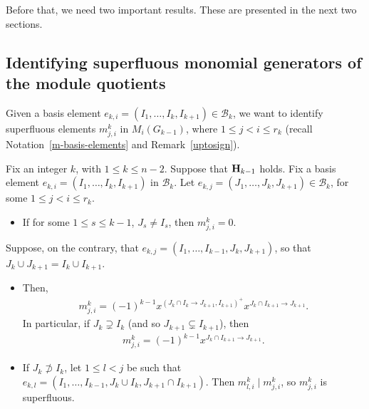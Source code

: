 \documentclass[ALCO]{cedram}
\newcommand{\mcb}{\mbox{$\mathcal{B}$}}
\newcommand{\mbfh}{\mbox{${\bf H}$}}
\begin{document}
Before that, we need two important results. These are presented in the next
two sections.

\subsection{Identifying superfluous monomial generators of the 
module quotients}

 Given a basis element $e_{k,i}=(I_1,\ldots
,I_k,I_{k+1})\in\mcb_k$, we want to identify superfluous elements
$m^k_{j,i}$ in $M_{i}(G_{k-1})$, where $1\leq j<i\leq r_k$ (recall
Notation~\ref{m-basis-elements} and Remark~\ref{uptosign}).

\begin{lemma}\label{superfluous}
Fix an integer $k$, with $1\leq k\leq n-2$. Suppose that $\mbfh_{k-1}$
holds. Fix a basis element $e_{k,i}=(I_1,\ldots ,I_k,I_{k+1})$ in
$\mcb_k$. Let $e_{k,j}=(J_1,\ldots ,J_k,J_{k+1})\in\mcb_k$, for some
$1\leq j<i\leq r_k$.
\begin{itemize}
\item[$(a)$] If for some $1\leq s\leq k-1$, $J_s\neq I_s$, then
  $m^k_{j,i}=0$. 
\end{itemize}
Suppose, on the contrary, that $e_{k,j}=(I_1,\ldots
,I_{k-1},J_{k},J_{k+1})$, so that $J_k\cup J_{k+1}=I_{k}\cup I_{k+1}$.
\begin{itemize}
\item[$(b)$] Then, 
\begin{eqnarray*}
m^k_{j,i} =(-1)^{k-1}x^{(J_k\cap I_k\to J_{k+1},I_{k+1})^+}x^{J_k\cap
  I_{k+1}\to J_{k+1}}.
\end{eqnarray*}
 In particular, if $J_k\supsetneq I_k$ (and so $J_{k+1}\subsetneq
 I_{k+1}$), then
\begin{eqnarray}\label{mji}
m^k_{j,i}=(-1)^{k-1}x^{J_{k}\cap I_{k+1}\to J_{k+1}}.
\end{eqnarray}
\item[$(c)$] If $J_k\not\supset I_k$, let $1\leq l<j$ be such that
  $e_{k,l}=(I_1,\ldots ,I_{k-1},J_{k}\cup I_k,J_{k+1}\cap
  I_{k+1})$. Then $m^k_{l,i}\mid m^k_{j,i}$, so $m^k_{j,i}$ is
  superfluous.
\end{itemize}
\end{lemma}
\end{document}
